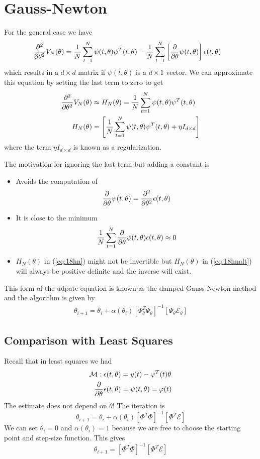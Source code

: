 \section{Gauss-Newton}
For the general case we have
\begin{align*}
\frac{\partial^2}{\partial\theta^2}V_N(\theta) &= \frac{1}{N}\sum_{t=1}^N\psi(t,\theta)\psi^T(t,\theta) - \frac{1}{N}\sum_{t=1}^N\left[\frac{\partial}{\partial\theta}\psi(t,\theta)\right]\epsilon(t,\theta)
\end{align*}
which results in a $d\times d$ matrix if $\psi(t,\theta)$ is a $d\times1$ vector.
We can approximate this equation by setting the last term to zero to get
\begin{align}
\label{eq:18hn}
\frac{\partial^2}{\partial\theta^2}V_N(\theta) &\approx H_N(\theta) = \frac{1}{N}\sum_{t=1}^N\psi(t,\theta)\psi^T(t,\theta) \\
\label{eq:18hnalt}
H_N(\theta) &= \left[\frac{1}{N}\sum_{t=1}^N\psi(t,\theta)\psi^T(t,\theta) + \eta I_{d\times d}\right]
\end{align}
where the term $\eta I_{d\times d}$ is known as a regularization.

The motivation for ignoring the last term but adding a constant is
\begin{itemize}
\item Avoids the computation of
$$\frac{\partial}{\partial\theta}\psi(t,\theta) = \frac{\partial^2}{\partial\theta^2}\epsilon(t,\theta)$$
\item It is close to the minimum
$$\frac{1}{N}\sum_{t=1}^N\frac{\partial}{\partial\theta}\psi(t,\theta)\epsilon(t,\theta) \approx 0$$
\item $H_N(\theta)$ in (\ref{eq:18hn}) might not be invertible but $H_N(\theta)$ in (\ref{eq:18hnalt}) will always be positive definite and the inverse will exist.
\end{itemize}
This form of the udpate equation is known as the damped Gauss-Newton method and the algorithm is given by
\begin{align*}
\boxed{\theta_{i+1} = \theta_i + \alpha(\theta_i){\left[\Psi_\theta^T\Psi_\theta\right]}^{-1} \left[\Psi_\theta\mathcal{E}_\theta\right]}
\end{align*}

\subsection{Comparison with Least Squares}
Recall that in least squares we had
\begin{align*}
\mathcal{M}: \epsilon(t,\theta) &= y(t) - \varphi^T(t)\theta \\
\frac{\partial}{\partial\theta}\epsilon(t,\theta) &= \psi(t,\theta) = \varphi(t)
\end{align*}
The estimate does not depend on $\theta$! The iteration is
$$\theta_{i+1} = \theta_i + \alpha(\theta_i){\left[\Phi^T\Phi\right]}^{-1}\left[\Phi^T\mathcal{E}\right]$$
We can set $\theta_i=0$ and $\alpha(\theta_i)=1$ because we are free to choose the starting point and step-size function.
This gives
$$\theta_{i+1} = {\left[\Phi^T\Phi\right]}^{-1}\left[\Phi^T\mathcal{E}\right]$$

